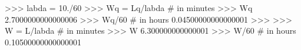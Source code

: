 
>>> labda = 10./60
>>> Wq = Lq/labda # in minutes
>>> Wq
2.7000000000000006
>>> Wq/60 # in hours
0.04500000000000001
>>>
>>> W = L/labda # in minutes
>>> W
6.300000000000001
>>> W/60 # in hours
0.10500000000000001

